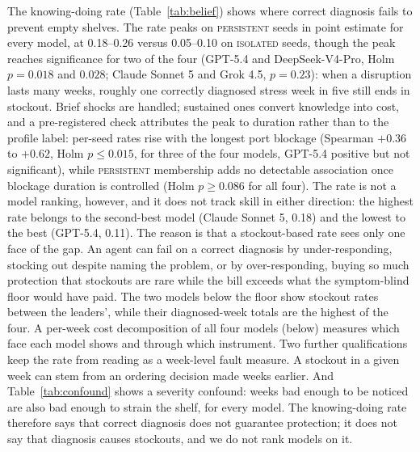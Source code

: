 \documentclass{article}
\begin{document}
The knowing-doing rate (Table~\ref{tab:belief}) shows where correct diagnosis
fails to prevent empty shelves. The rate peaks on
\textsc{persistent} seeds in point estimate for every model, at 0.18--0.26
versus 0.05--0.10 on \textsc{isolated} seeds, though the peak reaches
significance for two of the four (GPT-5.4 and DeepSeek-V4-Pro, Holm
$p = 0.018$ and $0.028$; Claude Sonnet 5 and Grok 4.5, $p = 0.23$): when a
disruption lasts many weeks, roughly one correctly diagnosed stress week
in five still ends in stockout.
Brief shocks are handled; sustained ones convert knowledge into cost, and
a pre-registered check attributes the peak to duration rather than to the
profile label: per-seed rates rise with the longest port blockage
(Spearman $+0.36$ to $+0.62$, Holm $p \le 0.015$, for three of the four
models, GPT-5.4 positive but not significant), while \textsc{persistent}
membership adds no detectable association once blockage duration is
controlled (Holm $p \ge 0.086$ for all four).
The rate is not a model ranking, however, and it does not track skill in
either direction: the highest rate belongs to the second-best model
(Claude Sonnet 5, 0.18) and the lowest to the best (GPT-5.4, 0.11). The
reason is that a
stockout-based rate sees only one face of the gap. An agent can fail on a
correct diagnosis by under-responding, stocking out despite naming the
problem, or by over-responding, buying so much protection that
stockouts are rare while the bill exceeds what the symptom-blind floor
would have paid. The two models below the floor show stockout rates
between the leaders', while their diagnosed-week totals are the highest
of the four. A per-week cost decomposition of all
four models (below) measures which face each model shows and through
which instrument. Two further qualifications keep
the rate from reading as a week-level fault measure. A
stockout in a given week can stem from an ordering decision made weeks
earlier. And Table~\ref{tab:confound} shows a severity confound: weeks
bad enough to be noticed are also bad enough to strain the shelf,
for every model. The knowing-doing rate therefore
says that correct diagnosis does not guarantee protection; it does not say
that diagnosis causes stockouts, and we do not rank models on it.
\end{document}
